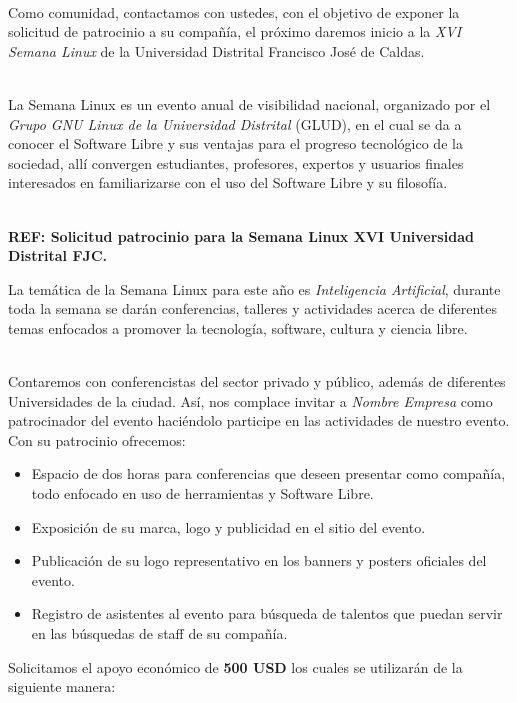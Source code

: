 
\\

Como comunidad, contactamos con ustedes, con el objetivo de exponer la solicitud de patrocinio a su compañía, el próximo %
daremos inicio a la \textit{XVI Semana Linux} de la Universidad Distrital Francisco Jos\'e de Caldas.

\\
La Semana Linux es un evento anual de visibilidad nacional, organizado por el \textit{Grupo GNU Linux de la Universidad Distrital} (GLUD), en el cual se da a conocer el Software Libre y sus ventajas para el progreso tecnológico de la sociedad, allí convergen estudiantes, profesores, expertos y usuarios finales interesados en familiarizarse con el uso del Software Libre y su filosofía.

\\
\textbf{REF: Solicitud patrocinio para la Semana Linux XVI Universidad Distrital FJC.}

La temática de la Semana Linux para este año es \textit{Inteligencia Artificial}, durante toda la semana se darán conferencias, talleres y actividades acerca de diferentes temas enfocados a promover la tecnología, software, cultura y ciencia libre.

\\
Contaremos con conferencistas del sector privado y público, además de diferentes Universidades de la ciudad. Así, nos complace invitar a \textit{Nombre Empresa} como patrocinador del evento haciéndolo participe en las actividades de nuestro evento. Con su patrocinio ofrecemos:

\begin{itemize}
    \item Espacio de dos horas para conferencias que deseen presentar como compañía, todo enfocado en uso de herramientas y Software Libre.
    \item Exposición de su marca, logo y publicidad en el sitio del evento.
    \item Publicación de su logo representativo en los banners y posters oficiales del evento.
    \item Registro de asistentes al evento para b\'usqueda de talentos que puedan servir en las b\'usquedas de staff de su compañía.
\end{itemize}

Solicitamos el apoyo económico de \textbf{500 USD} los cuales se utilizarán de la siguiente manera:

